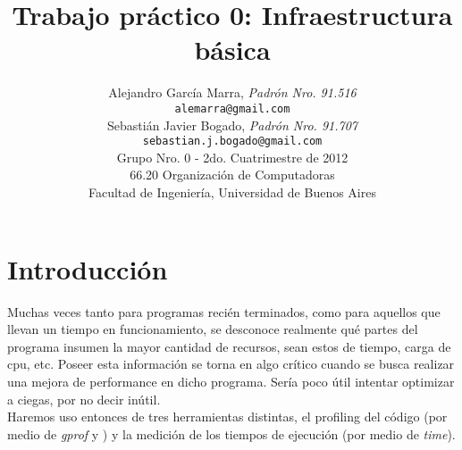 \documentclass[a4paper,10pt]{article}
\title{		\textbf{Trabajo pr\'actico 0: Infraestructura b\'asica}}
\author{	Alejandro Garc\'ia Marra, \textit{Padr\'on Nro. 91.516}                     \\
            \texttt{ alemarra@gmail.com }                                              \\
            Sebasti\'an Javier Bogado, \textit{Padr\'on Nro. 91.707}                     \\
            \texttt{ sebastian.j.bogado@gmail.com }                                              \\
            \normalsize{Grupo Nro. 0 - 2do. Cuatrimestre de 2012}                       \\
            \normalsize{66.20 Organizaci\'on de Computadoras}                             \\
            \normalsize{Facultad de Ingenier\'ia, Universidad de Buenos Aires}            \\
       }
\date{}
\begin{document}
\maketitle

\thispagestyle{empty}

\begin{abstract}

\end{abstract}

\newpage
\section{Introducci\'on}

Muchas veces tanto para programas reci\'en terminados, como para aquellos que llevan un tiempo en funcionamiento, se desconoce realmente qu\'e partes del programa insumen la mayor cantidad de recursos, sean estos de tiempo, carga de cpu, etc.
Poseer esta informaci\'on se torna en algo cr\'itico cuando se busca realizar una mejora de performance en dicho programa. Ser\'ia poco \'util intentar optimizar a ciegas, por no decir in\'util.\\
Haremos uso entonces de tres herramientas distintas, el profiling del c\'odigo (por medio de \textit{gprof} y ) y la medici\'on de los tiempos de ejecuci\'on (por medio de \textit{time}). 
\end{document}

